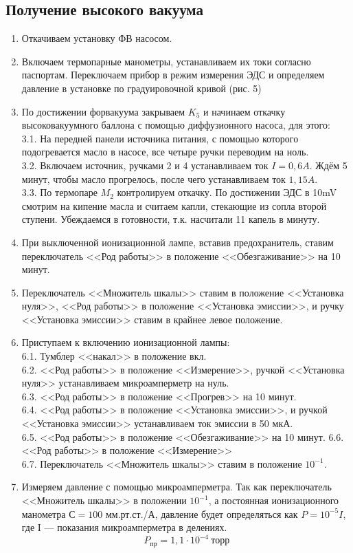 \documentclass[12pt,a4paper]{article}
\begin{document}
\subsection*{Получение высокого вакуума}
	\begin{enumerate}
	\item Откачиваем установку ФВ насосом.
	\item Включаем термопарные манометры, устанавливаем их токи согласно паспортам. Переключаем прибор в режим измерения ЭДС и определяем давление в установке по градуировочной кривой (рис. 5)
	\item По достижении форвакуума закрываем $K_5$ и начинаем откачку высоковакуумного баллона с помощью диффузионного насоса, для этого:\\
	3.1. На передней панели источника питания, с помощью которого подогревается масло в насосе, все четыре ручки переводим на ноль.\\
	3.2. Включаем источник, ручками 2 и 4 устанавливаем ток $I = 0,6A$. Ждём 5 минут, чтобы масло прогрелось, после чего устанавливаем ток $1,15A$. \\
	3.3. По термопаре $M_2$ контролируем откачку. По достижении ЭДС в 10mV смотрим на кипение масла и считаем капли, стекающие из сопла второй ступени. Убеждаемся в готовности, т.к. насчитали 11 капель в минуту.
	\item При выключенной ионизационной лампе, вставив предохранитель, ставим переключатель <<Род работы>> в положение <<Обезгаживание>> на 10 минут.
	\item Переключатель <<Множитель шкалы>> ставим в положение <<Установка нуля>>, <<Род работы>> в положение <<Установка эмиссии>>, и ручку <<Установка эмиссии>> ставим в крайнее левое положение.
	\item Приступаем к включению ионизационной лампы: \\
	6.1. Тумблер <<накал>> в положение вкл. \\
	6.2. <<Род работы>> в положение <<Измерение>>, ручкой <<Установка нуля>> устанавливаем микроамперметр на нуль.\\
	6.3. <<Род работы>> в положение <<Прогрев>> на 10 минут. \\
	6.4. <<Род работы>> в положение <<Установка эмиссии>>, и ручкой <<Установка эмиссии>> устанавливаем ток эмиссии в 50 мкА. \\ 
	6.5. <<Род работы>> в положение <<Обезгаживание>> на 10 минут.
	6.6. <<Род работы>> в положение <<Измерение>> \\
	6.7. Переключатель <<Множитель шкалы>> ставим в положение $10^{-1}$. 
	\item Измеряем давление с помощью микроамперметра. Так как переключатель <<Множитель шкалы>> в положении $10^{-1}$, а постоянная ионизационного манометра $С = 100$ мм.рт.ст./А, давление будет определяться как $P = 10^{-5} I$, где I --- показания микроамперметра в делениях. \\
	$$P_{\text{пр}} = 1,1\cdot10^{-4} ~\text{торр}$$	
\end{enumerate}
\end{document}

